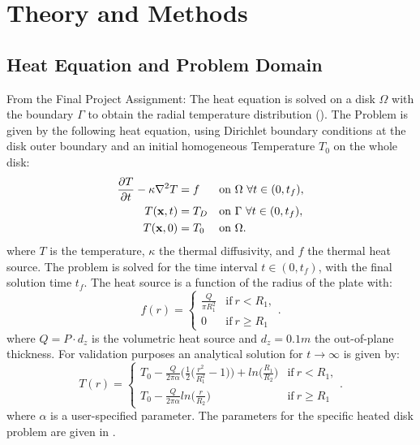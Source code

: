 \section{Theory and Methods}

\subsection{Heat Equation and Problem Domain}

From the Final Project Assignment:
The heat equation is solved on a disk $\Omega$ with the boundary $\Gamma$ to obtain the radial temperature distribution (). The Problem is given by the following heat equation, using Dirichlet boundary conditions at the disk outer boundary and an initial homogeneous Temperature $T_0$ on the whole disk:
\begin{align}
	\label{eq:Heat}
	\pp{T}{t}-\kappa \nabla^2 T &= f &&\text{on} \ \Omega \ \forall t \in (0,t_f),\\
	T(\vect{x},t) &= T_D &&\text{on} \ \Gamma \ \forall t \in (0,t_f), \label{eq:Dirichlet}\\
	T(\vect{x},0) &= T_0 &&\text{on} \ \Omega.
\end{align}
where $T$ is the temperature, $\kappa$ the thermal diffusivity, and $f$ the thermal heat source. The problem is solved for the time interval $t \in (0,t_f)$, with the final solution time $t_f$. The heat source is a function of the radius of the plate with:
\begin{equation}
	f(r) = \left\{\begin{array}{ll}\frac{Q}{\pi R_1^2} & \text{if} \ r < R_1, \\
		0 & \text{if} \ r \geq R_1 \end{array}\right . .
\end{equation}
where $Q=P \cdot d_z$ is the volumetric heat source and $d_z = 0.1m $ the out-of-plane thickness. For validation purposes an analytical solution for $t \rightarrow \infty$ is given by:
\begin{equation}
	\label{eq:analytical}
	T(r) = \left\{\begin{array}{ll} T_0-\frac{Q}{2 \pi \alpha } \big(\frac{1}{2} \big(\frac{r^2}{R_1^2} - 1\big)\big)+ln\big(\frac{R_1}{R_2}\big) & \text{if} \ r < R_1, \\
		T_0 - \frac{Q}{2 \pi \alpha } ln\big(\frac{r}{R_2}\big)& \text{if} \ r \geq R_1 \end{array}\right . .
\end{equation}
where $\alpha$ is a user-specified parameter. The parameters for the specific heated disk problem are given in .
